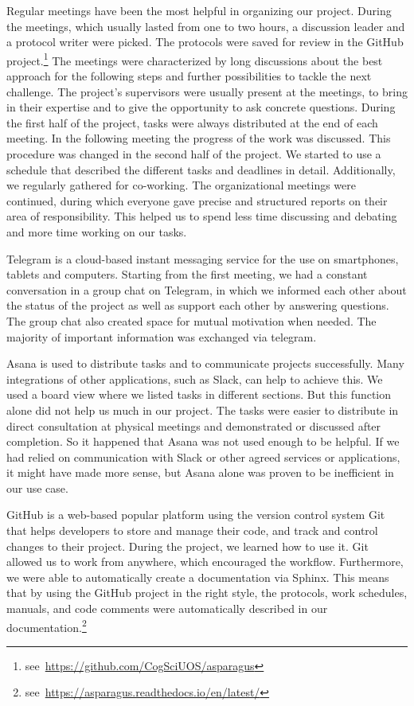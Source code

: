 \bigskip
Regular meetings have been the most helpful in organizing our project. During the meetings, which usually lasted from one to two hours, a discussion leader and a protocol writer were picked. The protocols were saved for review in the GitHub project.\footnote{ see~\url{https://github.com/CogSciUOS/asparagus}} The meetings were characterized by long discussions about the best approach for the following steps and further possibilities to tackle the next challenge. The project’s supervisors were usually present at the meetings, to bring in their expertise and to give the opportunity to ask concrete questions. During the first half of the project, tasks were always distributed at the end of each meeting. In the following meeting the progress of the work was discussed. This procedure was changed in the second half of the project. We started to use a schedule that described the different tasks and deadlines in detail. Additionally, we regularly gathered for co-working. The organizational meetings were continued, during which everyone gave precise and structured reports on their area of responsibility. This helped us to spend less time discussing and debating and more time working on our tasks.

Telegram is a cloud-based instant messaging service for the use on smartphones, tablets and computers. Starting from the first meeting, we had a constant conversation in a group chat on Telegram, in which we informed each other about the status of the project as well as support each other by answering questions. The group chat also created space for mutual motivation when needed. The majority of important information was exchanged via telegram.

Asana is used to distribute tasks and to communicate projects successfully. Many integrations of other applications, such as Slack, can help to achieve this. We used a board view where we listed tasks in different sections. But this function alone did not help us much in our project. The tasks were easier to distribute in direct consultation at physical meetings and demonstrated or discussed after completion. So it happened that Asana was not used enough to be helpful. If we had relied on communication with Slack or other agreed services or applications, it might have made more sense, but Asana alone was proven to be inefficient in our use case.

GitHub is a web-based popular platform using the version control system Git that helps developers to store and manage their code, and track and control changes to their project. During the project, we learned how to use it. Git allowed us to work from anywhere, which encouraged the workflow. Furthermore, we were able to automatically create a documentation via Sphinx. This means that by using the GitHub project in the right style, the protocols, work schedules, manuals, and code comments were automatically described in our documentation.\footnote{see~\url{https://asparagus.readthedocs.io/en/latest/}}


